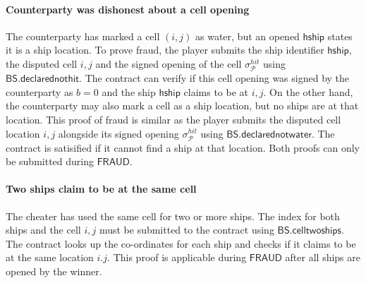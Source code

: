 \documentclass{llncs}
\newcommand{\gamefraud}{\mathsf{FRAUD}}
\newcommand{\hship}{\mathsf{hship}}
\newcommand{\participant}{\mathcal{P}}
\newcommand{\battleshipdeclarednothit}{\mathsf{BS.declarednothit}}
\newcommand{\battleshipdeclarednotwater}{\mathsf{BS.declarednotwater}}
\newcommand{\battleshiptwoships}{\mathsf{BS.celltwoships}}
\begin{document}
\paragraph{Counterparty was dishonest about a cell opening}
The counterparty has marked a cell $(i,j)$ as water, but an opened $\hship$ states it is a ship location. 
To prove fraud, the player submits the ship identifier $\hship$, the disputed cell $i,j$ and the signed opening of the cell $\sigma^{hit}_{\participant}$ using $\battleshipdeclarednothit$.
The contract can verify if this cell opening was signed by the counterparty as $b = 0$ and the ship $\hship$ claims to be at $i,j$.   
On the other hand, the counterparty may also mark a cell as a ship location,  but no ships are at that location.
This proof of fraud is similar as the player submits the disputed cell location $i,j$ alongside its signed opening $\sigma^{hit}_{\participant}$ using $\battleshipdeclarednotwater$. 
The contract is satisified if it cannot find a ship at that location. 
Both proofs can only be submitted during $\gamefraud$. 



\paragraph{Two ships claim to be at  the same cell} 
The cheater has used the same cell for two or more ships.  
The index for both ships and the cell $i,j$ must be submitted to the contract using $\battleshiptwoships$. 
The contract looks up the co-ordinates for each ship and checks if it claims to be at the same location $i.j$.
This proof is applicable during $\gamefraud$ after all ships are opened by the winner. 
\end{document}
